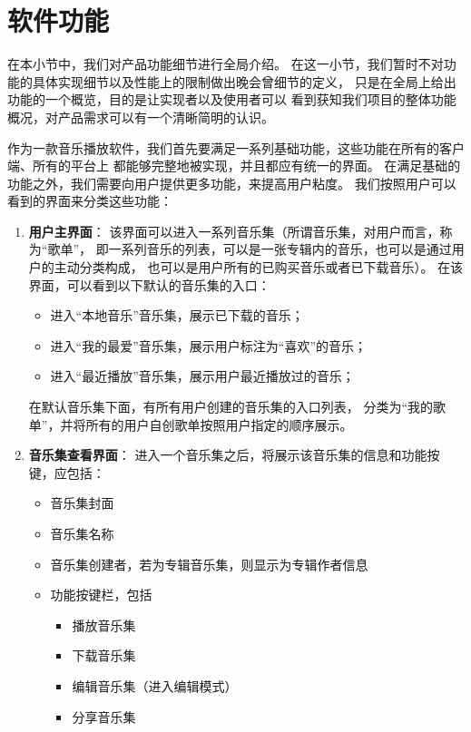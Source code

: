 \section{软件功能}

在本小节中，我们对\proname 产品功能细节进行全局介绍。
在这一小节，我们暂时不对功能的具体实现细节以及性能上的限制做出晚会曾细节的定义，
    只是在全局上给出功能的一个概览，目的是让实现者以及使用者可以
    看到获知我们项目的整体功能概况，对产品需求可以有一个清晰简明的认识。

作为一款音乐播放软件，我们首先要满足一系列基础功能，这些功能在所有的客户端、所有的平台上
    都能够完整地被实现，并且都应有统一的界面。
在满足基础的功能之外，我们需要向用户提供更多功能，来提高用户粘度。
我们按照用户可以看到的界面来分类这些功能：
\begin{enumerate}
    \item \textbf{用户主界面}：
    该界面可以进入一系列音乐集（所谓音乐集，对用户而言，称为``歌单''，
        即一系列音乐的列表，可以是一张专辑内的音乐，也可以是通过用户的主动分类构成，
        也可以是用户所有的已购买音乐或者已下载音乐）。
        在该界面，可以看到以下默认的音乐集的入口：
        \begin{itemize}
            \item 进入``本地音乐''音乐集，展示已下载的音乐；
            \item 进入``我的最爱''音乐集，展示用户标注为``喜欢''的音乐；
            \item 进入``最近播放''音乐集，展示用户最近播放过的音乐；
        \end{itemize}
        在默认音乐集下面，有所有用户创建的音乐集的入口列表，
        分类为``我的歌单''，并将所有的用户自创歌单按照用户指定的顺序展示。
    \item \textbf{音乐集查看界面}：
    进入一个音乐集之后，将展示该音乐集的信息和功能按键，应包括：
        \begin{itemize}
            \item 音乐集封面
            \item 音乐集名称
            \item 音乐集创建者，若为专辑音乐集，则显示为专辑作者信息
            \item 功能按键栏，包括
            \begin{itemize}
                \item 播放音乐集 
                \item 下载音乐集 
                \item 编辑音乐集（进入编辑模式） 
                \item 分享音乐集 

\end{itemize}
\end{itemize}
\end{enumerate}
